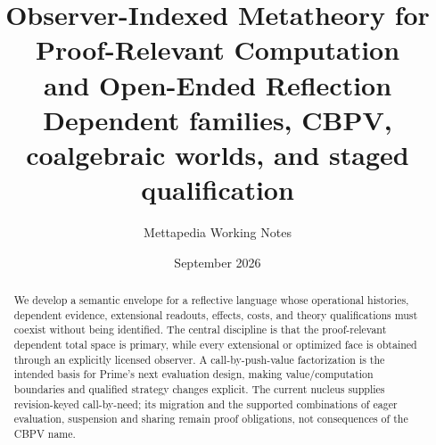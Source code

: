 \documentclass[11pt]{article}
\title{Observer-Indexed Metatheory for Proof-Relevant Computation\\
  and Open-Ended Reflection\\[3pt]
  \large Dependent families, CBPV, coalgebraic worlds, and staged qualification}
\author{Mettapedia Working Notes}
\date{September 2026}
\theoremstyle{definition}
\theoremstyle{remark}
\begin{document}
\maketitle

\begin{abstract}
We develop a semantic envelope for a reflective language whose operational
histories, dependent evidence, extensional readouts, effects, costs, and theory
qualifications must coexist without being identified.  The central discipline is
that the proof-relevant dependent total space is primary, while every extensional
or optimized face is obtained through an explicitly licensed observer.  A
call-by-push-value factorization is the intended basis for Prime's next
evaluation design, making value/computation boundaries and qualified strategy
changes explicit. The current nucleus supplies revision-keyed call-by-need;
its migration and the supported combinations of eager evaluation, suspension
and sharing remain proof obligations, not consequences of the CBPV name.


\end{abstract}
\end{document}
